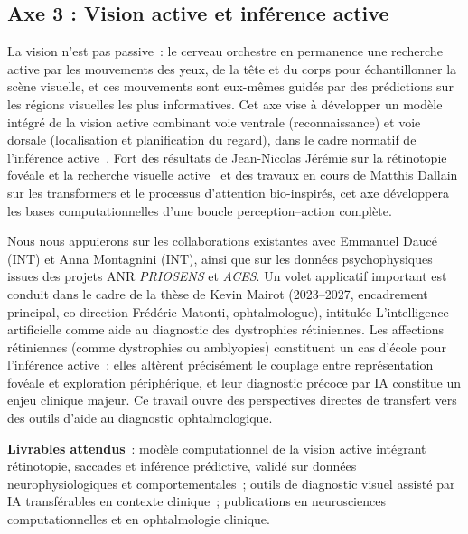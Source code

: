 \documentclass[10pt,french,a4paper]{article}%
\begin{document}
\subsection{Axe 3 : Vision active et inférence active}

La vision n'est pas passive~: le cerveau orchestre en permanence une recherche active par les mouvements des yeux, de la tête et du corps pour échantillonner la scène visuelle, et ces mouvements sont eux-mêmes guidés par des prédictions sur les régions visuelles les plus informatives. Cet axe vise à développer un modèle intégré de la vision active combinant voie ventrale (reconnaissance) et voie dorsale (localisation et planification du regard), dans le cadre normatif de l'inférence active~\citep{PerrinetAdamsFriston14}. Fort des résultats de Jean-Nicolas Jérémie sur la rétinotopie fovéale et la recherche visuelle active~\citep{Jeremie25thesis} et des travaux en cours de Matthis Dallain sur les transformers et le processus d'attention bio-inspirés, cet axe développera les bases computationnelles d'une boucle perception--action complète.

Nous nous appuierons sur les collaborations existantes avec Emmanuel Daucé (INT) et Anna Montagnini (INT), ainsi que sur les données psychophysiques issues des projets ANR \textit{PRIOSENS} et \textit{ACES}. Un volet applicatif important est conduit dans le cadre de la thèse de Kevin Mairot (2023--2027, encadrement principal, co-direction Frédéric Matonti, ophtalmologue), intitulée \og{}L'intelligence artificielle comme aide au diagnostic des dystrophies rétiniennes\fg{}. Les affections rétiniennes (comme dystrophies ou amblyopies) constituent un cas d'école pour l'inférence active~: elles altèrent précisément le couplage entre représentation fovéale et exploration périphérique, et leur diagnostic précoce par IA constitue un enjeu clinique majeur. Ce travail ouvre des perspectives directes de transfert vers des outils d'aide au diagnostic ophtalmologique. 

\textbf{Livrables attendus}~: modèle computationnel de la vision active intégrant rétinotopie, saccades et inférence prédictive, validé sur données neurophysiologiques et comportementales~; outils de diagnostic visuel assisté par IA transférables en contexte clinique~; publications en neurosciences computationnelles et en ophtalmologie clinique.

\end{document}
